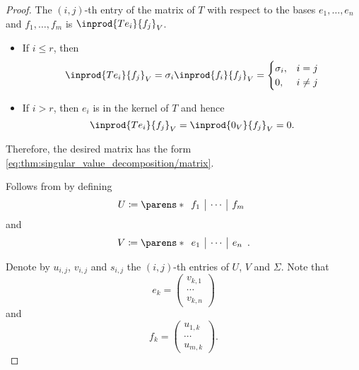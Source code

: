 \begin{proof}
  The \( (i, j) \)-th entry of the matrix of \( T \) with respect to the bases \( e_1, \ldots, e_n \) and \( f_1, \ldots, f_m \) is \( \inprod { T e_i } { f_j }_V \).
  \begin{itemize}
    \item If \( i \leq r \), then
    \begin{equation*}
      \inprod { T e_i } { f_j }_V
      =
      \sigma_i \inprod { f_i } { f_j }_V
      =
      \begin{cases}
        \sigma_i, &i = j \\
        0,        &i \neq j \\
      \end{cases}
    \end{equation*}

    \item If \( i > r \), then \( e_i \) is in the kernel of \( T \) and hence
    \begin{equation*}
      \inprod { T e_i } { f_j }_V
      =
      \inprod { 0_V } { f_j }_V
      =
      0.
    \end{equation*}
  \end{itemize}

  Therefore, the desired matrix has the form \eqref{eq:thm:singular_value_decomposition/matrix}.

   Follows from  by defining
  \begin{equation*}
    U \coloneqq \parens*
    {
      \begin{array}{c|c|c}
        f_1 & \cdots & f_m
      \end{array}
    }
  \end{equation*}
  and
  \begin{equation*}
    V \coloneqq \parens*
    {
      \begin{array}{c|c|c}
        e_1 & \cdots & e_n
      \end{array}
    }.
  \end{equation*}

  Denote by \( u_{i,j} \), \( v_{i,j} \) and \( s_{i,j} \) the \( (i, j) \)-th entries of \( U \), \( V \) and \( \Sigma \). Note that
  \begin{equation*}
    e_k = \begin{pmatrix} v_{k,1} \\ \cdots \\ v_{k,n} \end{pmatrix}
  \end{equation*}
  and
  \begin{equation*}
    f_k = \begin{pmatrix} u_{1,k} \\ \cdots \\ u_{m,k} \end{pmatrix}.
  \end{equation*}


\end{proof}
